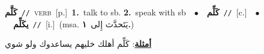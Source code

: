 \documentclass[10pt,a4paper,twoside]{article} %
\begin{document}
\begin{multicols}{2}
{\setlength\topsep{0pt}\textbf{\foreignlanguage{arabic}{كَلَّم}}\ {\color{gray}\texttt{//}\color{black}}\ \textsc{verb}\ [p.]\ \textbf{1.}~talk to sb.  \textbf{2.}~speak with sb\ \ $\bullet$\ \ \setlength\topsep{0pt}\textbf{\foreignlanguage{arabic}{كَلِّم}}\ {\color{gray}\texttt{//}\color{black}}\ [c.]\ \ $\bullet$\ \ \setlength\topsep{0pt}\textbf{\foreignlanguage{arabic}{يكَلِّم}}\ {\color{gray}\texttt{//}\color{black}}\ [i.]\ \color{gray}(msa. \foreignlanguage{arabic}{يَتَحدَّث إِلى}~\foreignlanguage{arabic}{\textbf{١.}})\color{black}\  \begin{flushright}\color{gray}\foreignlanguage{arabic}{\textbf{\underline{\foreignlanguage{arabic}{أمثلة}}}: كَلِّم أهلك خليهم يساعدوك ولو شوي}\end{flushright}\color{black}} \vspace{2mm}


\end{multicols}
\end{document}
